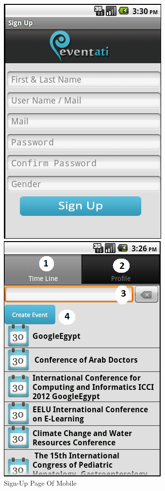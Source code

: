 \documentclass[12pt,a4paper,class,twoside,openany]{report}
\begin{document}
{\begin{figure}
	\begin{minipage}[b]{0.5\linewidth}
	\centering
	\includegraphics[height=4 in]{8-9}
	\caption{Sign-Up Page Of Mobile }
     \label{fg:8-9}
	\end{minipage}
	\hspace{0.5cm}
	\begin{minipage}[b]{0.5\linewidth}
	\centering
	\includegraphics[width=\textwidth]{8-10}

\end{minipage}
\end{figure}}
\end{document}
